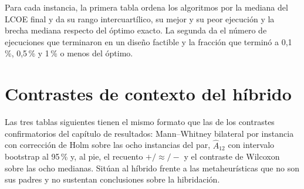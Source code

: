 Para cada instancia, la primera tabla ordena los algoritmos por la mediana del LCOE final y da su rango intercuartílico, su mejor y su peor ejecución y la brecha mediana respecto del óptimo exacto. La segunda da el número de ejecuciones que terminaron en un diseño factible y la fracción que terminó a 0,1\,\%, 0,5\,\% y 1\,\% o menos del óptimo.

\TablaRankingAutoA
\TablaExitoAutoA
\TablaRankingAutoB
\TablaExitoAutoB
\TablaRankingAutoC
\TablaExitoAutoC
\TablaRankingAutoD
\TablaExitoAutoD
\TablaRankingAutoE
\TablaExitoAutoE
\TablaRankingAutoF
\TablaExitoAutoF
\TablaRankingAutoG
\TablaExitoAutoG
\TablaRankingAutoH
\TablaExitoAutoH

\section{Contrastes de contexto del híbrido}

Las tres tablas siguientes tienen el mismo formato que las de los contrastes confirmatorios del capítulo de resultados: Mann--Whitney bilateral por instancia con corrección de Holm sobre las ocho instancias del par, $\hat{A}_{12}$ con intervalo bootstrap al 95\,\% y, al pie, el recuento $+/\approx/-$ y el contraste de Wilcoxon sobre las ocho medianas. Sitúan al híbrido frente a las metaheurísticas que no son sus padres y no sustentan conclusiones sobre la hibridación.

\TablaPUnoAutoGwo
\TablaPUnoAutoSho
\TablaPUnoAutoWoa
